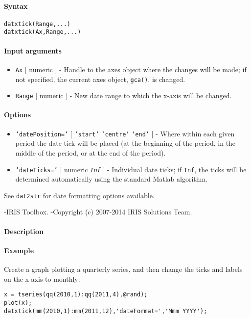 


	\paragraph{Syntax}

\begin{verbatim}
datxtick(Range,...)
datxtick(Ax,Range,...)
\end{verbatim}

\paragraph{Input arguments}

\begin{itemize}
\item
  \texttt{Ax} {[} numeric {]} - Handle to the axes object where the
  changes will be made; if not specified, the current axes object,
  \texttt{gca()}, is changed.
\item
  \texttt{Range} {[} numeric {]} - New date range to which the x-axis
  will be changed.
\end{itemize}

\paragraph{Options}

\begin{itemize}
\item
  \texttt{'datePosition='} {[} \texttt{'start'} \textbar{}
  \texttt{'centre'} \textbar{} \texttt{'end'} {]} - Where within each
  given period the date tick will be placed (at the beginning of the
  period, in the middle of the period, or at the end of the period).
\item
  \texttt{'dateTicks='} {[} numeric \textbar{} \emph{\texttt{Inf}} {]} -
  Individual date ticks; if \texttt{Inf}, the ticks will be determined
  automatically using the standard Matlab algorithm.
\end{itemize}

See \href{dates/dat2str}{\texttt{dat2str}} for date formatting options
available.

-IRIS Toolbox. -Copyright (c) 2007-2014 IRIS Solutions Team.

\paragraph{Description}

\paragraph{Example}

Create a graph plotting a quarterly series, and then change the ticks
and labels on the x-axis to monthly:

\begin{verbatim}
x = tseries(qq(2010,1):qq(2011,4),@rand);
plot(x);
datxtick(mm(2010,1):mm(2011,12),'dateFormat=','Mmm YYYY');
\end{verbatim}


